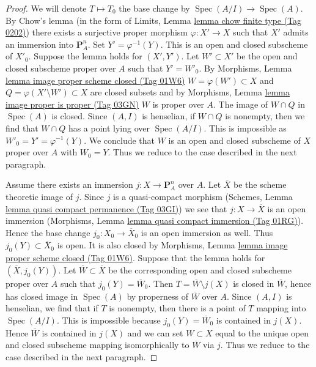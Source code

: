 \documentclass{amsart}
\theoremstyle{plain}
\theoremstyle{definition}
\theoremstyle{remark}
\numberwithin{equation}{subsection}
\def\Spec{\mathop{\mathrm{Spec}}}
\begin{document}
\begin{proof}
We will denote $T \mapsto T_0$ the base change by $\Spec(A/I) \to \Spec(A)$.
By Chow's lemma (in the form of
Limits, Lemma \href{https://stacks.math.columbia.edu/tag/0202}{lemma chow finite type (Tag 0202)})
there exists a surjective proper morphism $\varphi : X' \to X$ such
that $X'$ admits an immersion into $\mathbf{P}^n_A$.
Set $Y' = \varphi^{-1}(Y)$. This is an open and closed subscheme
of $X'_0$. Suppose the lemma holds for $(X', Y')$. Let $W' \subset X'$
be the open and closed subscheme proper over $A$ such that $Y' = W'_0$.
By Morphisms, Lemma \href{https://stacks.math.columbia.edu/tag/01W6}{lemma image proper scheme closed (Tag 01W6)}
$W = \varphi(W') \subset X$ and
$Q = \varphi(X' \setminus W') \subset X$ are closed subsets and by
Morphisms, Lemma \href{https://stacks.math.columbia.edu/tag/03GN}{lemma image proper is proper (Tag 03GN)}
$W$ is proper over $A$. The image of $W \cap Q$ in $\Spec(A)$ is closed.
Since $(A, I)$ is henselian, if $W \cap Q$ is nonempty, then we
find that $W \cap Q$ has a point lying over $\Spec(A/I)$.
This is impossible as $W'_0 = Y' = \varphi^{-1}(Y)$.
We conclude that $W$ is an open and closed subscheme
of $X$ proper over $A$ with $W_0 = Y$.
Thus we reduce to the case described in the next paragraph.

\medskip\noindent
Assume there exists an immersion $j : X \to \mathbf{P}^n_A$ over $A$.
Let $\overline{X}$ be the scheme theoretic image of $j$.
Since $j$ is a quasi-compact morphism
(Schemes, Lemma \href{https://stacks.math.columbia.edu/tag/03GI}{lemma quasi compact permanence (Tag 03GI)})
we see that $j : X \to \overline{X}$ is an open immersion
(Morphisms, Lemma \href{https://stacks.math.columbia.edu/tag/01RG}{lemma quasi compact immersion (Tag 01RG)}).
Hence the base change $j_0 : X_0 \to \overline{X}_0$
is an open immersion as well.
Thus $j_0(Y) \subset \overline{X}_0$ is open.
It is also closed by Morphisms, Lemma
\href{https://stacks.math.columbia.edu/tag/01W6}{lemma image proper scheme closed (Tag 01W6)}.
Suppose that the lemma holds for $(\overline{X}, j_0(Y))$.
Let $\overline{W} \subset \overline{X}$ be the
corresponding open and closed subscheme proper over $A$
such that $j_0(Y) = \overline{W}_0$.
Then $T = \overline{W} \setminus j(X)$ is closed in $\overline{W}$,
hence has closed image in $\Spec(A)$ by properness of $\overline{W}$
over $A$. Since $(A, I)$ is henselian, we find that if $T$
is nonempty, then there is a point of $T$ mapping into $\Spec(A/I)$.
This is impossible because $j_0(Y) = \overline{W}_0$ is contained in $j(X)$.
Hence $\overline{W}$ is contained in $j(X)$ and we can
set $W \subset X$ equal to the unique open and closed
subscheme mapping isomorphically to $\overline{W}$ via $j$.
Thus we reduce to the case described in the next paragraph.


\end{proof}
\end{document}
